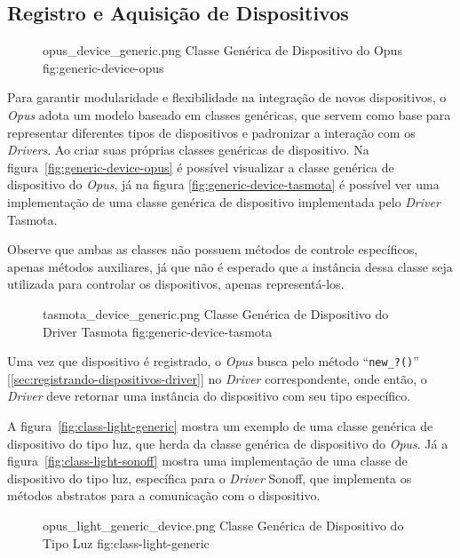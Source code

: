\subsection{Registro e Aquisição de Dispositivos}

\begin{figure}[H]
    {opus_device_generic.png}
    {Classe Genérica de Dispositivo do Opus}
    {fig:generic-device-opus}
\end{figure}

Para garantir modularidade e flexibilidade na integração de novos dispositivos, o \emph{Opus} adota um modelo baseado em classes genéricas,
que servem como base para representar diferentes tipos de dispositivos e padronizar a interação com os \emph{Drivers}. Ao criar suas próprias
classes genéricas de dispositivo. Na figura~\ref{fig:generic-device-opus} é possível visualizar a classe
genérica de dispositivo do \emph{Opus}, já na figura \ref{fig:generic-device-tasmota} é possível ver uma implementação de uma classe
genérica de dispositivo implementada pelo \emph{Driver} Tasmota.

Observe que ambas as classes não possuem métodos de controle específicos, apenas métodos auxiliares, já que não é esperado que a instância dessa
classe seja utilizada para controlar os dispositivos, apenas representá-los.

\begin{figure}[H]
    {tasmota_device_generic.png}
    {Classe Genérica de Dispositivo do Driver Tasmota}
    {fig:generic-device-tasmota}
\end{figure}

Uma vez que dispositivo é registrado, o \emph{Opus} busca pelo método ``\lstinline{new_?()}'' [\ref{sec:registrando-dispositivos-driver}]
no \emph{Driver} correspondente, onde então, o \emph{Driver} deve retornar uma instância do dispositivo com seu tipo específico.

A figura~\ref{fig:class-light-generic} mostra um exemplo de uma classe genérica de dispositivo do tipo luz, que herda da classe genérica de dispositivo
do \emph{Opus}. Já a figura~\ref{fig:class-light-sonoff} mostra uma implementação de uma classe de dispositivo do tipo luz,
específica para o \emph{Driver} Sonoff, que implementa os métodos abstratos para a comunicação com o dispositivo.

\begin{figure}[H]
    {opus_light_generic_device.png}
    {Classe Genérica de Dispositivo do Tipo Luz}
    {fig:class-light-generic}
\end{figure}

